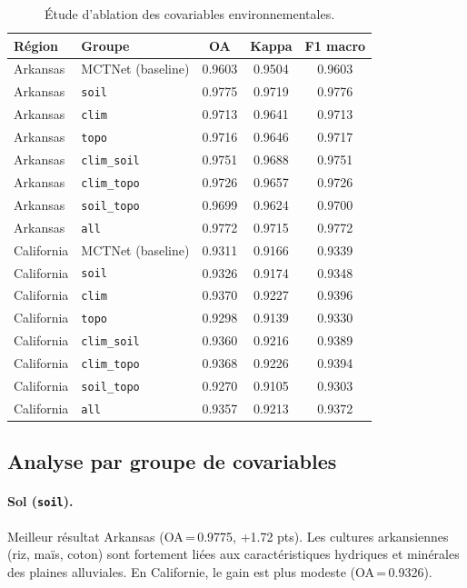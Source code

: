 \begin{table}[H]
\centering
\caption{Étude d'ablation des covariables environnementales.}
\label{tab:ablation_covariables}
\begin{tabular}{llccc}
\toprule
\textbf{Région} & \textbf{Groupe} & \textbf{OA} & \textbf{Kappa} & \textbf{F1 macro} \\
\midrule
Arkansas & MCTNet (baseline)   & 0.9603 & 0.9504 & 0.9603 \\
Arkansas & \texttt{soil}       & 0.9775 & 0.9719 & 0.9776 \\
Arkansas & \texttt{clim}       & 0.9713 & 0.9641 & 0.9713 \\
Arkansas & \texttt{topo}       & 0.9716 & 0.9646 & 0.9717 \\
Arkansas & \texttt{clim\_soil} & 0.9751 & 0.9688 & 0.9751 \\
Arkansas & \texttt{clim\_topo} & 0.9726 & 0.9657 & 0.9726 \\
Arkansas & \texttt{soil\_topo} & 0.9699 & 0.9624 & 0.9700 \\
Arkansas & \texttt{all}        & 0.9772 & 0.9715 & 0.9772 \\
\midrule
California & MCTNet (baseline)   & 0.9311 & 0.9166 & 0.9339 \\
California & \texttt{soil}       & 0.9326 & 0.9174 & 0.9348 \\
California & \texttt{clim}       & 0.9370 & 0.9227 & 0.9396 \\
California & \texttt{topo}       & 0.9298 & 0.9139 & 0.9330 \\
California & \texttt{clim\_soil} & 0.9360 & 0.9216 & 0.9389 \\
California & \texttt{clim\_topo} & 0.9368 & 0.9226 & 0.9394 \\
California & \texttt{soil\_topo} & 0.9270 & 0.9105 & 0.9303 \\
California & \texttt{all}        & 0.9357 & 0.9213 & 0.9372 \\
\bottomrule
\end{tabular}
\end{table}

\subsection{Analyse par groupe de covariables}

\paragraph{Sol (\texttt{soil}).}
Meilleur résultat Arkansas (OA\,=\,0.9775, +1.72 pts). Les cultures arkansiennes
(riz, maïs, coton) sont fortement liées aux caractéristiques hydriques et minérales
des plaines alluviales. En Californie, le gain est plus modeste (OA\,=\,0.9326).

